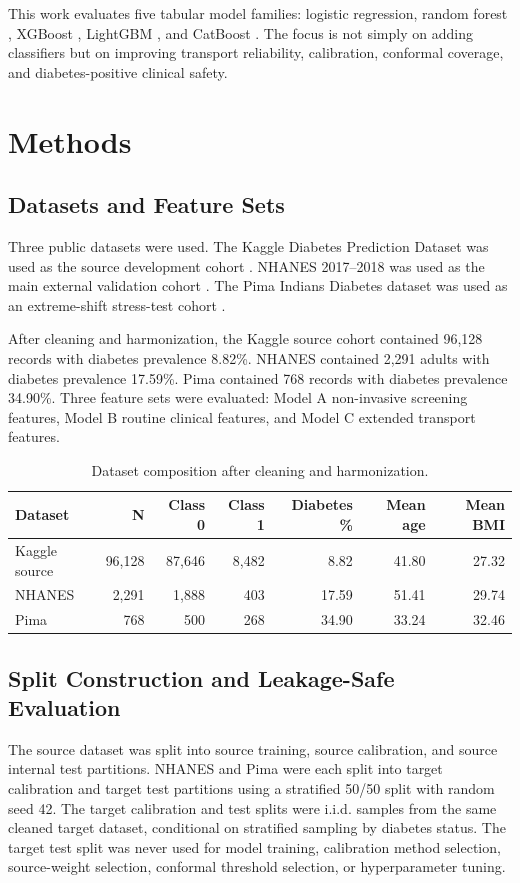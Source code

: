\documentclass{ieeeaccess}
\begin{document}
This work evaluates five tabular model families: logistic regression, random forest \cite{randomforest}, XGBoost \cite{xgboost}, LightGBM \cite{lightgbm}, and CatBoost \cite{catboost}. The focus is not simply on adding classifiers but on improving transport reliability, calibration, conformal coverage, and diabetes-positive clinical safety.

\section{Methods}
\subsection{Datasets and Feature Sets}
Three public datasets were used. The Kaggle Diabetes Prediction Dataset was used as the source development cohort \cite{mustafa2023dataset}. NHANES 2017--2018 was used as the main external validation cohort \cite{nhanes2018overview}. The Pima Indians Diabetes dataset was used as an extreme-shift stress-test cohort \cite{smith1988using}.

After cleaning and harmonization, the Kaggle source cohort contained 96,128 records with diabetes prevalence 8.82\%. NHANES contained 2,291 adults with diabetes prevalence 17.59\%. Pima contained 768 records with diabetes prevalence 34.90\%. Three feature sets were evaluated: Model A non-invasive screening features, Model B routine clinical features, and Model C extended transport features.

\begin{table}[!t]
\centering
\caption{Dataset composition after cleaning and harmonization.}
\label{tab:dataset}
\begin{tabular}{lrrrrrr}
\toprule
Dataset & N & Class 0 & Class 1 & Diabetes \% & Mean age & Mean BMI \\
\midrule
Kaggle source & 96,128 & 87,646 & 8,482 & 8.82 & 41.80 & 27.32 \\
NHANES & 2,291 & 1,888 & 403 & 17.59 & 51.41 & 29.74 \\
Pima & 768 & 500 & 268 & 34.90 & 33.24 & 32.46 \\
\bottomrule
\end{tabular}
\end{table}

\subsection{Split Construction and Leakage-Safe Evaluation}
The source dataset was split into source training, source calibration, and source internal test partitions. NHANES and Pima were each split into target calibration and target test partitions using a stratified 50/50 split with random seed 42. The target calibration and test splits were i.i.d. samples from the same cleaned target dataset, conditional on stratified sampling by diabetes status. The target test split was never used for model training, calibration method selection, source-weight selection, conformal threshold selection, or hyperparameter tuning.
\end{document}
